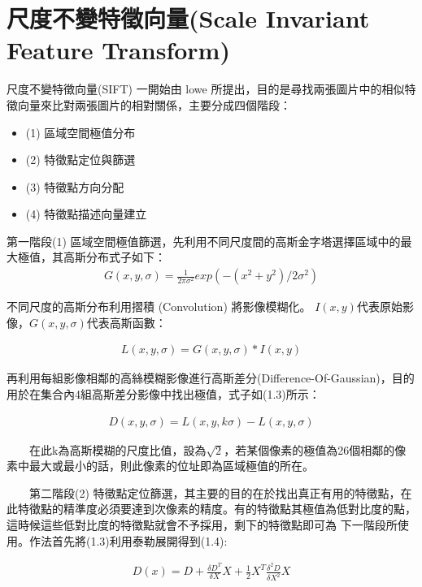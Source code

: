 

\section{尺度不變特徵向量(Scale Invariant Feature Transform)}
	尺度不變特徵向量(SIFT) 一開始由 lowe \cite{Lowe2004} 所提出，目的是尋找兩張圖片中的相似特徵向量來比對兩張圖片的相對關係，主要分成四個階段：
\begin{itemize}
	\item (1) 區域空間極值分布
    \item (2) 特徵點定位與篩選
    \item (3) 特徵點方向分配
    \item (4) 特徵點描述向量建立
\end{itemize}

   第一階段(1) 區域空間極值篩選，先利用不同尺度間的高斯金字塔選擇區域中的最大極值，其高斯分布式子如下：
\begin{align}
  G(x,y,\sigma) = \frac{1}{2\pi\sigma^2}exp(-(x^2+y^2)/2\sigma^2) 
\end{align}

	不同尺度的高斯分布利用摺積 (Convolution) 將影像模糊化。 $I(x,y)$代表原始影像，$G(x,y,\sigma)$代表高斯函數：
	
\begin{align}
  L(x,y,\sigma) = G(x,y,\sigma)\ast{I(x,y)}
\end{align}

    再利用每組影像相鄰的高絲模糊影像進行高斯差分(Difference-Of-Gaussian)，目的用於在集合內4組高斯差分影像中找出極值，式子如(1.3)所示：
    
\begin{align}
  D(x,y,\sigma) = L(x,y,k\sigma)-L(x,y,\sigma)
\end{align}

　　在此k為高斯模糊的尺度比值，設為$\sqrt{2}$，若某個像素的極值為26個相鄰的像素中最大或最小的話，則此像素的位址即為區域極值的所在。

　　第二階段(2) 特徵點定位篩選，其主要的目的在於找出真正有用的特徵點，在此特徵點的精準度必須要達到次像素的精度。有的特徵點其極值為低對比度的點，這時候這些低對比度的特徵點就會不予採用，剩下的特徵點即可為
下一階段所使用。作法首先將(1.3)利用泰勒展開得到(1.4):
 
\begin{align}
  D(x) = D + \frac{\delta D^T}{\delta X}X + \frac{1}{2}X^T\frac{\delta^2 D}{\delta X^2}X
\end{align}

